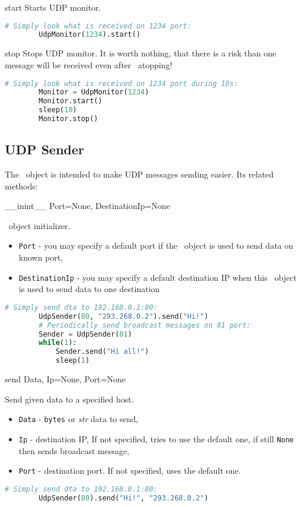  {start} {} {
	Starts UDP monitor.
}
\begin{lstlisting}[language=Python]
		# Simply look what is received on 1234 port:
		UdpMonitor(1234).start()
\end{lstlisting}

 {stop} {} {
	Stops UDP monitor. It is worth nothing, that there is a risk than one message will be received even after \UdpMonitor\ atopping!
}
\begin{lstlisting}[language=Python]
		# Simply look what is received on 1234 port during 10s:
		Monitor = UdpMonitor(1234)
		Monitor.start()
		sleep(10)
		Monitor.stop()
\end{lstlisting}

\subsection{UDP Sender}

The \UdpSender\ object is intended to make UDP messages sending easier. Its related methods:

 {\_\_inint\_\_} {Port=None, DestinationIp=None} {
	\UdpMonitor\ object initializer.
	\begin{itemize}
		\item \texttt{Port} - you may specify a default port if the \UdpSender\ object is used to send data on known port,
		\item \texttt{DestinationIp} - you may specify a default destination IP when this \UdpSender\ object is used to send data to one destination
	\end{itemize}
}
\begin{lstlisting}[language=Python]
		# Simply send dta to 192.168.0.1:80:
		UdpSender(80, "293.268.0.2").send("Hi!")
		# Periodically send broadcast messages on 81 port:
		Sender = UdpSender(81)
		while(1):
			Sender.send("Hi all!")
			sleep(1)
\end{lstlisting}

 {send} {Data, Ip=None, Port=None} {
	Send given data to a specified host.
	\begin{itemize}
		\item \texttt{Data} - \texttt{bytes} or \textit{str} data to send, 
		\item \texttt{Ip} - destination IP, If not specified, tries to use the default one, if still \texttt{None} then sends broadcast message,
		\item \texttt{Port} - destination port. If not specified, uses the default one.
	\end{itemize}
}
\begin{lstlisting}[language=Python]
		# Simply send dta to 192.168.0.1:80:
		UdpSender(80).send("Hi!", "293.268.0.2")
\end{lstlisting}

